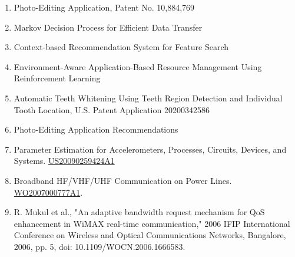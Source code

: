 
	
\begin{enumerate}
	\vspace{10pt}
	
		\item{Photo-Editing Application, Patent No. 10,884,769}
		
		\item{Markov Decision Process for Efficient Data Transfer}
	
	\item{Context-based Recommendation System for Feature Search}
	
		\item{Environment-Aware Application-Based Resource Management Using Reinforcement Learning}
		
		\item{Automatic Teeth Whitening Using Teeth Region Detection and Individual Tooth Location, U.S. Patent Application 20200342586}
	
	\item{Photo-Editing Application Recommendations}
	
		\item{Parameter Estimation for Accelerometers, Processes, Circuits, Devices, and Systems. \href{https://patents.google.com/patent/US20090259424A1/en}{US20090259424A1}}
		
		\item{Broadband HF/VHF/UHF Communication on Power Lines. \href{https://patents.google.com/patent/WO2007000777A1/de}{WO2007000777A1}.}
		
		\item{R. Mukul et al., "An adaptive bandwidth request mechanism for QoS enhancement in WiMAX real-time communication," 2006 IFIP International Conference on Wireless and Optical Communications Networks, Bangalore, 2006, pp. 5, doi: 10.1109/WOCN.2006.1666583.
		}
\end{enumerate}
